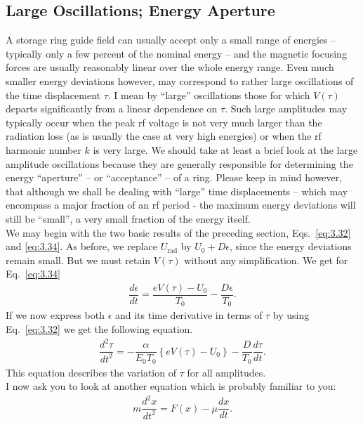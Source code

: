 \subsection{Large Oscillations; Energy Aperture}\label{sec:3.6}

A storage ring guide field can usually accept only a small range of energies -- typically
 only a few percent of the nominal energy -- and the magnetic focusing forces are usually reasonably linear over the whole energy range. Even much smaller energy deviations however, may correspond to rather large oscillations of the time displacement $\tau$. I mean by ``large'' oscillations those for which $V(\tau)$ departs significantly from a linear dependence on $\tau$.
 Such large amplitudes may typically occur when the peak rf voltage is not very much larger than the radiation loss (as is usually the case at very high energies) or when the rf harmonic number
$k$ is very large. We should take at least a brief look at the large amplitude oscillations  because they are generally responsible for determining the energy “aperture” -- or “acceptance”
 -- of a ring. Please keep in mind however, that although we shall be dealing with ``large'' time displacements -- which may encompass a major fraction of an rf period - the maximum energy deviations will still be ``small'', a very small fraction of the energy itself.\\
We may begin with the two basic results of the preceding section, Eqs.~\eqref{eq:3.32} and \eqref{eq:3.34}. As before, we replace $U_{\text{rad}}$ by $U_0 + D\epsilon$, since the energy deviations remain small. But we must retain $V(\tau)$ without any simplification. We get for
Eq.~\eqref{eq:3.34}
\begin{align}
	\dfrac{d\epsilon}{dt} = \dfrac{eV(\tau)-U_0}{T_0}-\dfrac{D\epsilon}{T_0}.
\end{align}
If we now express both $\epsilon$ and its time derivative in terms of $\tau$ by using Eq.~\eqref{eq:3.32} we get the following equation.
\begin{align}\label{eq:3.49}
	\dfrac{d^2\tau}{dt^2} = -\dfrac{\alpha}{E_0 T_0} \left\lbrace eV(\tau) - U_0 \right\rbrace - \dfrac{D}{T_0} \dfrac{d\tau}{dt}.
\end{align}
This equation describes the variation of $\tau$ for all amplitudes.\\
I now ask you to look at another equation which is probably familiar to you:
\begin{align}\label{eq:3.50}
	m\dfrac{d^2x}{dt^2} = F(x) - \mu \dfrac{dx}{dt}.
\end{align}
